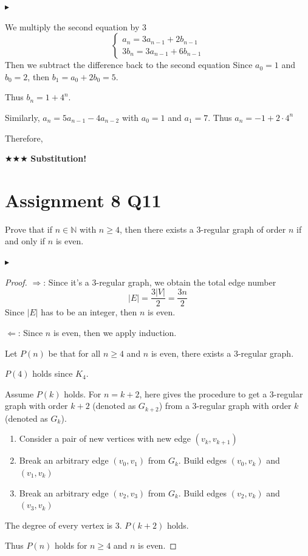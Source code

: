 $\blacktriangleright$

We multiply the second equation by $3$
\begin{equation*}
    \begin{cases}
        a_n=3a_{n-1}+2b_{n-1}\\
        3b_n=3a_{n-1}+6b_{n-1}
    \end{cases}
\end{equation*}
Then we subtract the difference back to the second equation
Since $a_0=1$ and $b_0=2$, then $b_1=a_0+2b_0=5$.

Thus $b_n=1+4^n$.

Similarly, $a_n=5a_{n-1}-4a_{n-2}$ with $a_0=1$ and $a_1=7$. Thus $a_n=-1+2\cdot4^n$

Therefore,

$\bigstar\bigstar\bigstar$ \textbf{Substitution!}
\section*{Assignment 8 Q11}
Prove that if $n\in\mathbb{N}$ with $n\geq4$, then there exists a 3-regular graph of order $n$ if
and only if $n$ is even.

$\blacktriangleright$ \begin{proof}
$\Rightarrow$: Since it's a 3-regular graph, we obtain the total edge number $$|E|=\frac{3|V|}{2}=\frac{3n}{2}$$ Since $|E|$ has to be an integer, then $n$ is even.

$\Leftarrow$: Since $n$ is even, then we apply induction.

Let $P(n)$ be that for all $n\geq4$ and $n$ is even, there exists a 3-regular graph.

$P(4)$ holds since $K_4$.

Assume $P(k)$ holds. For $n=k+2$, here gives the procedure to get a 3-regular graph with order $k+2$ (denoted as $G_{k+2}$) from a 3-regular graph with order $k$ (denoted as $G_{k}$).
\begin{enumerate}
    \item Consider a pair of new vertices with new edge $(v_{k}, v_{k+1})$
    \item Break an arbitrary edge $(v_0, v_1)$ from $G_{k}$. Build edges $(v_0, v_{k})$ and $(v_1, v_{k})$
    \item Break an arbitrary edge $(v_2, v_3)$ from $G_{k}$. Build edges $(v_2, v_{k})$ and $(v_3, v_{k})$
\end{enumerate}
The degree of every vertex is 3. $P(k+2)$ holds.

Thus $P(n)$ holds for $n\geq4$ and $n$ is even.
\end{proof}


